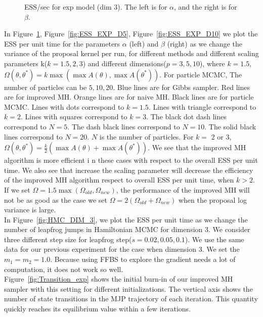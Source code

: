 \begin{figure}
\begin{minipage}[hp]{0.45\linewidth}
    \vspace{-0 in}
  \end{minipage}
    \caption{ESS/sec for exp model (dim 3). The left is for $\alpha$, and the right is for $\beta$.}
     \label{fig:ESS_EXP_D3}
  \end{figure}
  In Figure~\ref{fig:ESS_EXP_D3}, Figure~\ref{fig:ESS_EXP_D5}, Figure~\ref{fig:ESS_EXP_D10} we plot the ESS per unit time for the parameters $\alpha$ (left) and $\beta$ (right) as we change the variance of the
  proposal kernel per run, for different methods and different scaling parameters k($k = 1.5, 2, 3$) and different dimensions($p = 3, 5, 10$), where   $k = 1.5$,  $\Omega(\theta, \theta^*) = k \max(\max A(\theta), \max A(\theta^*))$. For particle MCMC, The number of particles can be $5, 10 , 20$. Blue lines are for Gibbs sampler. Red lines are for improved MH. Orange lines are for naive MH. Black lines are for particle MCMC. Lines with dots correspond to $k = 1.5$. Lines with triangle correspond to $k = 2$. Lines with squares correspond to $k = 3$.  The black dot dash lines correspond to $N  = 5$. The dash black lines correspond to $N  = 10$. The solid black lines correspond to $N  = 20$. $N$ is the number of particles. For $k=$ $2$ or $3$, $\Omega(\theta, \theta^*) = \frac{k}{2} (\max A(\theta) + \max A(\theta^*))$. We see that the improved MH algorithm is more efficient i	n these cases with respect to the overall ESS per unit time. We also see that increase the scaling parameter will decrease the efficiency of the improved MH algorithm respect to overall ESS per unit time, when $k > 2$. If we set $\Omega = 1.5 \max(\Omega_{old}, \Omega_{new})$, the performance of the improved MH will not be as good as the case we set $\Omega = 2(\Omega_{old} + \Omega_{new})$ when the proposal log variance is large.\\

In Figure~\ref{fig:HMC_DIM_3}, we plot the ESS per unit time as we change the number of leapfrog jumps in Hamiltonian MCMC for dimension $3$. We consider three different step size for leapfrog step($s = 0.02, 0.05, 0.1$). We 
use the same data for our previous experiment for the case when dimension $3$. We set the $m_1 = m_2 = 1.0$. Because using FFBS to explore the gradient needs a lot of computation, it does not work so well.\\

Figure~\ref{fig:Transition_exp} shows the initial burn-in of our improved MH sampler with this setting for different initializations. The vertical axis shows the number of state transitions in the MJP trajectory of each iteration. This quantity quickly reaches its equilibrium value within a few iterations.\\


